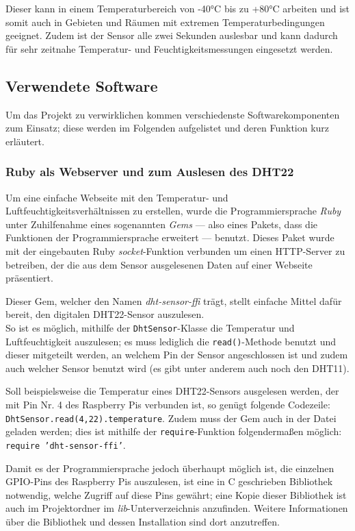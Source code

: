 \documentclass[a4paper,12pt]{article}
\begin{document}
Dieser kann in einem Temperaturbereich von -40°C bis zu +80°C arbeiten und ist somit auch in Gebieten und Räumen mit extremen Temperaturbedingungen geeignet. Zudem ist der Sensor alle zwei Sekunden auslesbar und kann dadurch für sehr zeitnahe Temperatur- und Feuchtigkeitsmessungen eingesetzt werden.
\pagebreak

\subsection{Verwendete Software}
Um das Projekt zu verwirklichen kommen verschiedenste Softwarekomponenten zum Einsatz; diese werden im Folgenden aufgelistet und deren Funktion kurz erläutert. 

\subsubsection{Ruby als Webserver und zum Auslesen des DHT22}
Um eine einfache Webseite mit den Temperatur- und Luftfeuchtigkeitsverhältnissen zu erstellen, wurde die Programmiersprache \textit{Ruby} unter Zuhilfenahme eines sogenannten \textit{Gems} — also eines Pakets, dass die Funktionen der Programmiersprache erweitert — benutzt. Dieses Paket wurde mit der eingebauten Ruby \textit{socket}-Funktion verbunden um einen HTTP-Server zu betreiben, der die aus dem Sensor ausgelesenen Daten auf einer Webseite präsentiert.

Dieser Gem, welcher den Namen \textit{dht-sensor-ffi} trägt, stellt einfache Mittel dafür bereit, den digitalen DHT22-Sensor auszulesen.\\
So ist es möglich, mithilfe der \texttt{DhtSensor}-Klasse die Temperatur und Luftfeuchtigkeit auszulesen; es muss lediglich die \texttt{read()}-Methode benutzt und dieser mitgeteilt werden, an welchem Pin der Sensor angeschlossen ist und zudem auch welcher Sensor benutzt wird (es gibt unter anderem auch noch den DHT11). 

Soll beispielsweise die Temperatur eines DHT22-Sensors ausgelesen werden, der mit Pin Nr. 4 des Raspberry Pis verbunden ist, so genügt folgende Codezeile: \texttt{DhtSensor.read(4,22).temperature}. Zudem muss der Gem auch in der Datei geladen werden; dies ist mithilfe der \texttt{require}-Funktion folgendermaßen möglich: \texttt{require 'dht-sensor-ffi'}.

Damit es der Programmiersprache jedoch überhaupt möglich ist, die einzelnen GPIO-Pins des Raspberry Pis auszulesen, ist eine in C geschrieben Bibliothek notwendig, welche Zugriff auf diese Pins gewährt; eine Kopie dieser Bibliothek ist auch im Projektordner im \textit{lib}-Unterverzeichnis anzufinden. Weitere Informationen über die Bibliothek und dessen Installation sind dort anzutreffen.
\end{document}

